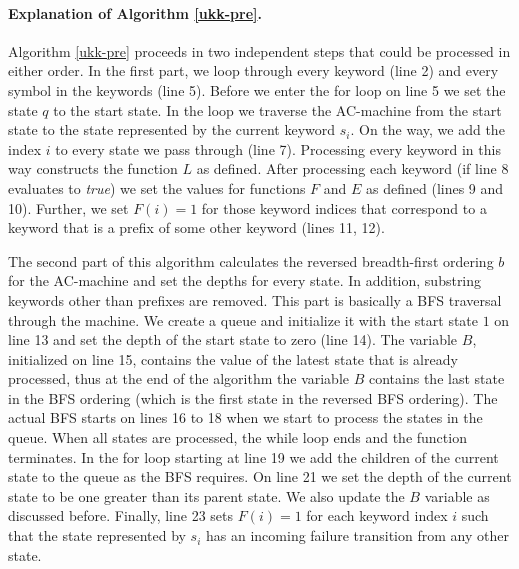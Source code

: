 \documentclass[english,twoside,censored,csm,algorithms-track-2020]{HYthesisML}
\theoremstyle{plain}
\theoremstyle{definition}
\begin{document}
\paragraph{Explanation of Algorithm \ref{ukk-pre}.}  
Algorithm \ref{ukk-pre} proceeds in two independent steps that could be processed in either order.
In the first part, we loop through every keyword (line 2) and every symbol in the keywords (line 5).
Before we enter the for loop on line 5 we set the state $q$ to the start state. In the loop
we traverse the AC-machine from the start state to the state represented by the current keyword $s_i$.
On the way, we add the index $i$ to every state we pass through (line 7). Processing every keyword in this
way constructs the function $L$ as defined. After processing each keyword (if line 8 evaluates to
\textit{true}) we set the values for functions $F$ and $E$ as defined (lines 9 and 10).
Further, we set $F(i) = 1$ for those keyword indices that correspond to a keyword that is a prefix
of some other keyword (lines 11, 12).

The second part of this algorithm calculates the reversed breadth-first ordering $b$ for the
AC-machine and set the depths for every state.
In addition, substring keywords other than
prefixes are removed. This part is basically a BFS traversal through the machine. We create a queue
and initialize it with the start state $1$ on line 13 and set the depth of the start state to
zero (line 14). The variable $B$, initialized on line 15, contains the value of the latest state
that is already processed, thus at the end of the algorithm the variable $B$ contains the last state
in the BFS ordering (which is the first state in the reversed BFS ordering). The actual BFS starts
on lines 16 to 18 when we start to process the states in the queue. When all states are processed,
the while loop ends and the function terminates. In the for loop starting at line 19 we add the
children of the current state to the queue as the BFS requires. On line 21 we set the depth
of the current state to be one greater than its parent state. We also update the $B$ variable
as discussed before. Finally, line 23 sets $F(i) = 1$ for each keyword index $i$ such that
the state represented by $s_i$ has an incoming failure transition from any other state.\vspace{0.5cm}
  
\end{document}
